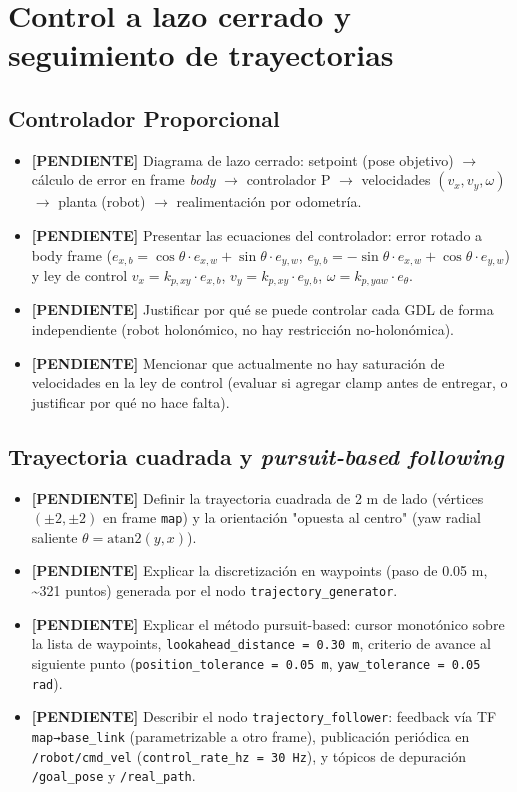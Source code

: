 \documentclass[11pt,a4paper]{article}
\newcommand{\TODO}[1]{\textcolor{todocolor}{\textbf{[PENDIENTE]} #1}}
\newenvironment{tareas}{\begin{itemize}\setlength{\itemsep}{2pt}}{\end{itemize}}
\begin{document}
\section{Control a lazo cerrado y seguimiento de trayectorias}
\subsection{Controlador Proporcional}
\begin{tareas}
    \item \TODO{Diagrama de lazo cerrado: setpoint (pose objetivo) $\to$ cálculo de error en frame \emph{body} $\to$ controlador P $\to$ velocidades $(v_x, v_y, \omega)$ $\to$ planta (robot) $\to$ realimentación por odometría.}
    \item \TODO{Presentar las ecuaciones del controlador: error rotado a body frame ($e_{x,b} = \cos\theta \cdot e_{x,w} + \sin\theta \cdot e_{y,w}$, $e_{y,b} = -\sin\theta \cdot e_{x,w} + \cos\theta \cdot e_{y,w}$) y ley de control $v_x = k_{p,xy} \cdot e_{x,b}$, $v_y = k_{p,xy} \cdot e_{y,b}$, $\omega = k_{p,yaw} \cdot e_\theta$.}
    \item \TODO{Justificar por qué se puede controlar cada GDL de forma independiente (robot holonómico, no hay restricción no-holonómica).}
    \item \TODO{Mencionar que actualmente no hay saturación de velocidades en la ley de control (evaluar si agregar clamp antes de entregar, o justificar por qué no hace falta).}
\end{tareas}

\subsection{Trayectoria cuadrada y \emph{pursuit-based following}}
\begin{tareas}
    \item \TODO{Definir la trayectoria cuadrada de 2 m de lado (vértices $(\pm2,\pm2)$ en frame \texttt{map}) y la orientación "opuesta al centro" (yaw radial saliente $\theta = \mathrm{atan2}(y,x)$).}
    \item \TODO{Explicar la discretización en waypoints (paso de 0.05 m, \textasciitilde321 puntos) generada por el nodo \texttt{trajectory\_generator}.}
    \item \TODO{Explicar el método pursuit-based: cursor monotónico sobre la lista de waypoints, \texttt{lookahead\_distance = 0.30 m}, criterio de avance al siguiente punto (\texttt{position\_tolerance = 0.05 m}, \texttt{yaw\_tolerance = 0.05 rad}).}
    \item \TODO{Describir el nodo \texttt{trajectory\_follower}: feedback vía TF \texttt{map→base\_link} (parametrizable a otro frame), publicación periódica en \texttt{/robot/cmd\_vel} (\texttt{control\_rate\_hz = 30 Hz}), y tópicos de depuración \texttt{/goal\_pose} y \texttt{/real\_path}.}
\end{tareas}
\end{document}

